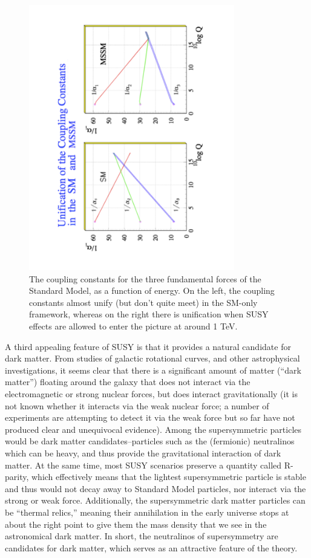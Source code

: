 \begin{figure}
    \center
	\includegraphics[width=0.8\textwidth,angle=270]{Theory/figures/kazakov_coupling.pdf}
    \caption{The coupling constants for the three fundamental forces of the Standard Model, as a 
    function of energy.  On the left, the coupling constants almost unify 
    (but don't quite meet) in the SM-only framework, 
    whereas on the right there is unification when SUSY effects are allowed to 
    enter the picture at around 1 TeV\cite{Kazakov}. }
	\label{fig:couplings}
\end{figure}


A third appealing feature of SUSY is that it provides a natural candidate for dark 
matter.  From studies of galactic rotational curves, and other astrophysical investigations, it 
seems clear that there is a significant amount of matter (``dark matter'') floating 
around the galaxy that does not interact via the electromagnetic or strong nuclear forces, 
but does interact gravitationally (it is not known whether it interacts via the weak 
nuclear force; a number of experiments are attempting to detect it via the weak 
force but so far have not produced clear and unequivocal evidence).  Among the supersymmetric 
particles would be dark matter candidates--particles such as the (fermionic) neutralinos 
which can be heavy, and thus provide the gravitational interaction of dark matter.  
At the same time, most SUSY scenarios preserve a quantity called R-parity, 
which effectively means that the lightest supersymmetric particle is stable and thus 
would not decay away to Standard Model particles, nor interact via the strong or 
weak force.  Additionally, the supersymmetric dark matter particles can be ``thermal
relics,'' meaning their annihilation in the early universe stops at about the right
point to give them the mass density that we see in the astronomical dark matter.
In short, the neutralinos of supersymmetry are candidates for dark matter, 
which serves as an attractive feature of the theory. 


